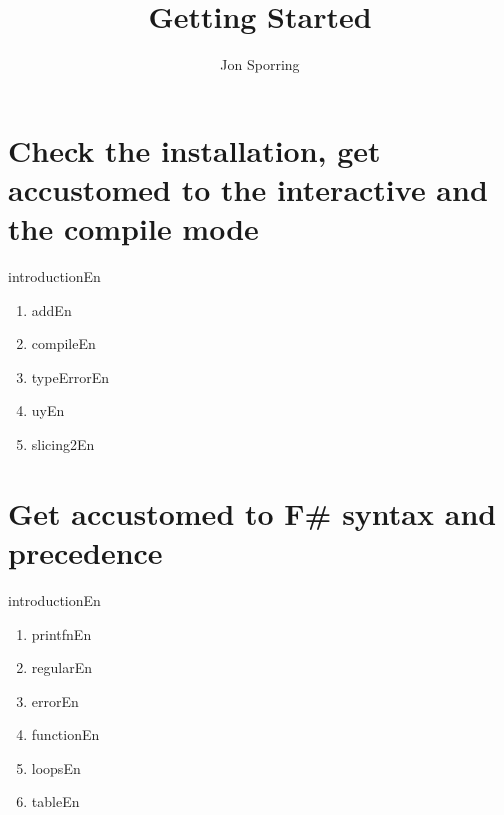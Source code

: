 \documentclass[a4paper,12pt]{article}
\title{Getting Started}
\author{Jon Sporring}
\begin{document}
\maketitle

% 
%
\section{Check the installation, get accustomed to the interactive
  and the compile mode}
{introductionEn}
\begin{enumerate}
\item {addEn}
\item {compileEn}
\item {typeErrorEn}
\item {uyEn}
\item {slicing2En}
\end{enumerate}
\section{Get accustomed to F\# syntax and precedence}
{introductionEn}
\begin{enumerate}
\item {printfnEn}
\item {regularEn}
\item {errorEn}
\item {functionEn}
\item {loopsEn}
\item {tableEn}
\end{enumerate}
\end{document}

